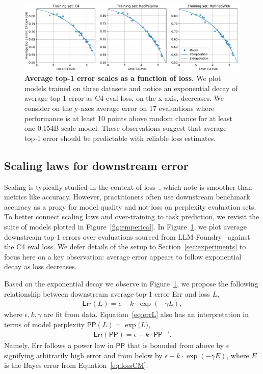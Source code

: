 \begin{figure}[tp]
    \centering
    \includegraphics[width=0.98\linewidth]{figs/downstream_emperical.pdf}
    \caption{\textbf{Average top-1 error scales as a function of loss.} We plot models trained on three datasets and notice an exponential decay of average top-1 error as C4 eval loss, on the x-axis, decreases.
    We consider on the y-axes average error on 17 evaluations where performance is at least 10 points above random chance for at least one 0.154B scale model.
    These observations suggest that average top-1 error should be predictable with reliable loss estimates.
    }
    \label{fig:downstream_corr}
\end{figure}

\subsection{Scaling laws for downstream error}
\label{sec:method_downstream}

Scaling is typically studied in the context of loss~\cite{kaplan2020scaling,chinchilla,muennighoff2023scaling}, which \citet{schaeffer2023emergent} note is smoother than metrics like accuracy.
However, practitioners often use downstream benchmark accuracy as a proxy for model quality and not loss on perplexity evaluation sets.
To better connect scaling laws and over-training to task prediction, we revisit the suite of models plotted in Figure~\ref{fig:emperical}.
In Figure~\ref{fig:downstream_corr}, we plot average downstream top-1 errors over evaluations sourced from LLM-Foundry~\cite{mosaicml} against the C4 eval loss.
We defer details of the setup to Section~\ref{sec:experiments} to focus here on a key observation: average error appears to follow exponential decay as loss decreases.

Based on the exponential decay we observe in Figure~\ref{fig:downstream_corr}, we propose the following relationship between downstream average top-1 error \textsf{Err} and loss $L$,
\begin{align}
\label{eq:errL}
\textsf{Err}(L) = \epsilon - k \cdot \exp{(-\gamma L)},
\end{align}
where $\epsilon, k, \gamma$ are fit from data.
Equation~\eqref{eq:errL} also has an interpretation in terms of model perplexity $\textsf{PP}(L) = \exp{(L})$,
\begin{align}
\label{eq:errPP}
\textsf{Err}(\textsf{PP}) = \epsilon - k \cdot \textsf{PP}^{-\gamma}.
\end{align}
Namely, \textsf{Err} follows a power law in $\textsf{PP}$ that is bounded from above by $\epsilon$ signifying arbitrarily high error and from below by $\epsilon - k \cdot 
\exp(-\gamma E)$, where $E$ is the Bayes error from Equation~\eqref{eq:lossCM}.

